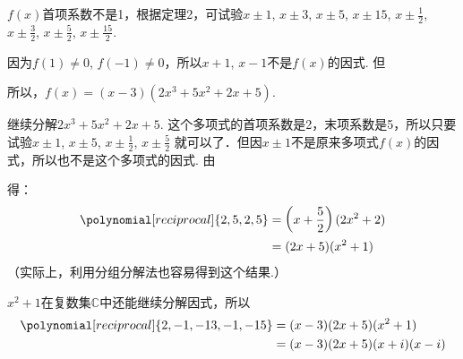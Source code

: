 \begin{analyze}
$f(x)$首项系数不是1，根据定理2，可试验$x\pm1$, $x\pm3$, $x\pm5$, $x\pm15$, $x\pm\frac{1}{2}$, $x\pm\frac{3}{2}$, $x\pm\frac{5}{2}$, $x\pm\frac{15}{2}$. 

因为$f(1)\ne 0$, $f(-1)\ne 0$，所以$x+1$, $x-1$不是$f(x)$的因式. 但
\begin{center}
\end{center}

所以，$f(x)=(x-3)(2x^3+5x^2+2x+5)$.

继续分解$2x^3+5x^2+2x+5$. 这个多项式的首项系数是2，末项系数是5，所以只要试验$x\pm 1$, $x\pm 5$, $x\pm \frac{1}{2}$, $x\pm \frac{5}{2}$ 就可以了．但因$x\pm 1$不是原来多项式$f(x)$的因式，所以也不是这个多项式的因式. 由
\begin{center}
\end{center}
得：
\[\begin{split}
\polynomial[reciprocal]{2,5,2,5}&=\left(x+\frac{5}{2}\right)(2x^2+2)\\
&=(2x+5)(x^2+1)
\end{split}\]
（实际上，利用分组分解法也容易得到这个结果.）

$x^2+1$在复数集$\mathbb{C}$中还能继续分解因式，所以
\[\begin{split}
    \polynomial[reciprocal]{2,-1,-13,-1,-15}&=(x-3)(2x+5)(x^2+1)\\
    &=(x-3)(2x+5)(x+i)(x-i)
\end{split}\]
\end{analyze}

